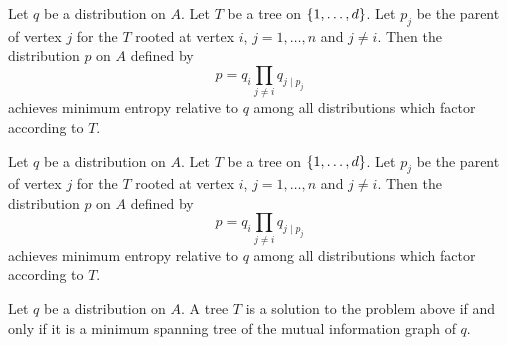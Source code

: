 
\begin{prop}
  Let $q$ be a distribution on $A$. Let $T$ be
  a tree on $\{1, \dots, d\}$. Let $p_j$ be
  the parent of vertex $j$ for the $T$ rooted
  at vertex $i$, $j = 1,\dots,n$ and $j \neq i$.
  Then the distribution $p$ on $A$ defined by
  \[
    p = q_i \prod_{j \neq i} q_{j \mid p_j}
  \]
  achieves minimum entropy relative to $q$ among
  all distributions which factor according to $T$.
\end{prop}

\begin{prop}
  Let $q$ be a distribution on $A$. Let $T$ be
  a tree on $\{1, \dots, d\}$. Let $p_j$ be
  the parent of vertex $j$ for the $T$ rooted
  at vertex $i$, $j = 1,\dots,n$ and $j \neq i$.
  Then the distribution $p$ on $A$ defined by
  \[
    p = q_i \prod_{j \neq i} q_{j \mid p_j}
  \]
  achieves minimum entropy relative to $q$ among
  all distributions which factor according to $T$.
\end{prop}

\begin{prop}
  Let $q$ be a distribution on $A$.
  A tree
  $T$ is a solution to the problem above
  if and only if it is a minimum spanning
  tree of the mutual information graph of $q$.
\end{prop}
\strats
